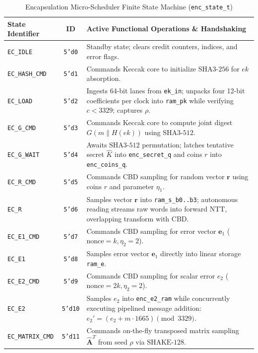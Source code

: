 \begin{table}[!t]
\caption{Encapsulation Micro-Scheduler Finite State Machine (\texttt{enc\_state\_t})}
\label{tab:encap_fsm}
\centering
\footnotesize
\begin{tabular}{@{} l c p{4.9cm} @{}}
\toprule
\textbf{State Identifier} & \textbf{ID} & \textbf{Active Functional Operations \& Handshaking} \\
\midrule
\texttt{EC\_IDLE} & \texttt{5'd0} & Standby state; clears credit counters, indices, and error flags. \\
\texttt{EC\_HASH\_CMD} & \texttt{5'd1} & Commands Keccak core to initialize $\text{SHA3-256}$ for $ek$ absorption. \\
\texttt{EC\_LOAD} & \texttt{5'd2} & Ingests 64-bit lanes from \texttt{ek\_in}; unpacks four 12-bit coefficients per clock into \texttt{ram\_pk} while verifying $c < 3329$; captures $\rho$. \\
\texttt{EC\_G\_CMD} & \texttt{5'd3} & Commands Keccak core to compute joint digest $G(m \parallel H(ek))$ using $\text{SHA3-512}$. \\
\texttt{EC\_G\_WAIT} & \texttt{5'd4} & Awaits $\text{SHA3-512}$ permutation; latches tentative secret $\hat{K}$ into \texttt{enc\_secret\_q} and coins $r$ into \texttt{enc\_coins\_q}. \\
\texttt{EC\_R\_CMD} & \texttt{5'd5} & Commands CBD sampling for random vector $\mathbf{r}$ using coins $r$ and parameter $\eta_1$. \\
\texttt{EC\_R} & \texttt{5'd6} & Samples vector $\mathbf{r}$ into \texttt{ram\_s\_b0..b3}; autonomous reading streams raw words into forward NTT, overlapping transform with CBD. \\
\texttt{EC\_E1\_CMD} & \texttt{5'd7} & Commands CBD sampling for error vector $\mathbf{e}_1$ ($\text{nonce} = k, \eta_2 = 2$). \\
\texttt{EC\_E1} & \texttt{5'd8} & Samples error vector $\mathbf{e}_1$ directly into linear storage \texttt{ram\_e}. \\
\texttt{EC\_E2\_CMD} & \texttt{5'd9} & Commands CBD sampling for scalar error $e_2$ ($\text{nonce} = 2k, \eta_2 = 2$). \\
\texttt{EC\_E2} & \texttt{5'd10} & Samples $e_2$ into \texttt{enc\_e2\_ram} while concurrently executing pipelined message addition: $e_2' = (e_2 + m \cdot 1665) \pmod{3329}$. \\
\texttt{EC\_MATRIX\_CMD} & \texttt{5'd11} & Commands on-the-fly transposed matrix sampling $\hat{\mathbf{A}}^T$ from seed $\rho$ via $\text{SHAKE-128}$. \\

\end{tabular}
\end{table}
